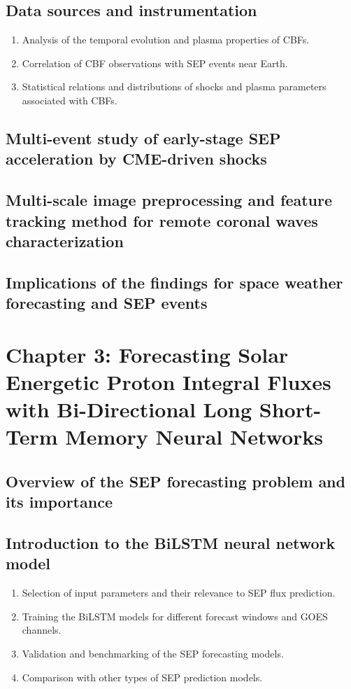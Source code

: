 \documentclass{article}
\begin{document}
\subsection{Data sources and instrumentation}
\begin{enumerate}
    \item Analysis of the temporal evolution and plasma properties of CBFs.
    \item Correlation of CBF observations with SEP events near Earth.
    \item Statistical relations and distributions of shocks and plasma parameters associated with CBFs.
\end{enumerate}
\subsection{Multi-event study of early-stage SEP acceleration by CME-driven shocks}
\subsection{Multi-scale image preprocessing and feature tracking method for remote coronal waves characterization}
\subsection{Implications of the findings for space weather forecasting and SEP events}

\section{Chapter 3: Forecasting Solar Energetic Proton Integral Fluxes with Bi-Directional Long Short-Term Memory Neural Networks}
%


\subsection{Overview of the SEP forecasting problem and its importance}
\subsection{Introduction to the BiLSTM neural network model}
\begin{enumerate}
    \item Selection of input parameters and their relevance to SEP flux prediction.
    \item Training the BiLSTM models for different forecast windows and GOES channels.
    \item Validation and benchmarking of the SEP forecasting models.
    \item Comparison with other types of SEP prediction models.
\end{enumerate}
\end{document}
